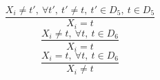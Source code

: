$$\frac{X_{i} \neq t',~\forall t',~t' \neq t,~t' \in D_{5},~t \in D_{5}}{X_{i}=t}$$ $$\frac{X_{i} \neq t,~\forall t,~t \in D_{6}}{X_{i}=t}$$ $$\frac{X_{i}=t,~\forall t,~t \in D_{6}}{X_{i} \neq t}$$ 